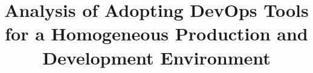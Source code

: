 \usepackage[utf8]{inputenc}
\usepackage[T1]{fontenc}
\usepackage{lmodern}
\usepackage{times}
\usepackage[american]{babel}
\usepackage{tikz}
\usepackage{listings}
\usepackage{subcaption}
\usepackage{bm}
\usepackage{booktabs}
\usepackage{amsfonts}
\usepackage{amsmath}
\usepackage{amssymb}
\usepackage{amsthm}
\usepackage{marvosym}
\let\marvosymLightning\Lightning


\usetikzlibrary{shapes,arrows,calc,positioning,fit}


\graphicspath{{img/}}

\newcommand{\source}[1]{\caption*{\textcolor{uos-grey-full}{Source: {#1}}} }
\newcommand{\RM}[1]{\MakeUppercase{\romannumeral{} #1{}}}
\newcommand{\code}[1]{\texttt{#1}}
\newcommand{\bull}[0]{\textbullet{}}
\newcommand{\tabitem}{{\color{uos-red-full}$\blacksquare$}}


\title[Development with DevContainers]{Analysis of Adopting DevOps Tools for a Homogeneous Production and Development Environment}



